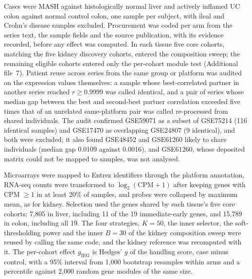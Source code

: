 \documentclass[pdflatex,sn-vancouver-num]{sn-jnl}
\theoremstyle{thmstyleone}
\theoremstyle{thmstyletwo}
\theoremstyle{thmstylethree}
\begin{document}
Cases were MASH against histologically normal liver and actively inflamed UC colon against
normal control colon, one sample per subject, with ileal and Crohn's disease samples excluded.
Procurement was coded per arm from the series text, the sample fields and the source
publication, with its evidence recorded, before any effect was computed. In each tissue five
core cohorts, matching the five kidney discovery cohorts, entered the composition sweep; the
remaining eligible cohorts entered only the per-cohort module test (Additional file~7). Patient
reuse across series from the same group or platform was audited on the expression values
themselves: a sample whose best-correlated partner in another series reached $r \ge 0.9999$ was
called identical, and a pair of series whose median gap between the best and second-best partner
correlation exceeded five times that of an unrelated same-platform pair was called re-processed
from shared individuals. The audit confirmed GSE59071 as a subset of GSE75214 (116 identical
samples) and GSE17470 as overlapping GSE24807 (9 identical), and both were excluded; it also
found GSE48452 and GSE61260 likely to share individuals (median gap 0.0109 against 0.0016), and
GSE61260, whose deposited matrix could not be mapped to samples, was not analysed.

Microarrays were mapped to Entrez identifiers through the platform annotation, RNA-seq counts
were transformed to $\log_2(\text{CPM}+1)$ after keeping genes with CPM $\ge 1$ in at least
20\% of samples, and probes were collapsed by maximum mean, as for kidney. Selection used the
genes shared by each tissue's five core cohorts: 7,805 in liver, including 11 of the 19
immediate-early genes, and 15,789 in colon, including all 19. The four strategies, $K = 50$, the
inner selector, the soft-thresholding power and the inner $B = 30$ of the kidney composition
sweep were reused by calling the same code, and the kidney reference was recomputed with it. The
per-cohort effect $g_{\text{IEG}}$ is Hedges' $g$ of the handling score, case minus control,
with a 95\% interval from 1,000 bootstrap resamples within arms and a percentile against 2,000
random gene modules of the same size.
\end{document}
